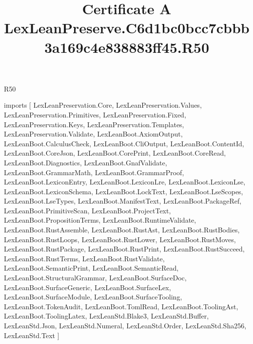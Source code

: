 \begin{lexlean}{R50}
\title{Certificate A LexLeanPreserve.C6d1bc0bcc7cbbb3a169c4e838883ff45.R50}
\begin{coremodule}
imports [
  LexLeanPreservation.Core,
  LexLeanPreservation.Values,
  LexLeanPreservation.Primitives,
  LexLeanPreservation.Fixed,
  LexLeanPreservation.Keys,
  LexLeanPreservation.Templates,
  LexLeanPreservation.Validate,
  LexLeanBoot.AxiomOutput,
  LexLeanBoot.CalculusCheck,
  LexLeanBoot.CliOutput,
  LexLeanBoot.ContentId,
  LexLeanBoot.CoreJson,
  LexLeanBoot.CorePrint,
  LexLeanBoot.CoreRead,
  LexLeanBoot.Diagnostics,
  LexLeanBoot.GnafValidate,
  LexLeanBoot.GrammarMath,
  LexLeanBoot.GrammarProof,
  LexLeanBoot.LexiconEntry,
  LexLeanBoot.LexiconLre,
  LexLeanBoot.LexiconLse,
  LexLeanBoot.LexiconSchema,
  LexLeanBoot.LockText,
  LexLeanBoot.LseScopes,
  LexLeanBoot.LseTypes,
  LexLeanBoot.ManifestText,
  LexLeanBoot.PackageRef,
  LexLeanBoot.PrimitiveScan,
  LexLeanBoot.ProjectText,
  LexLeanBoot.PropositionTerms,
  LexLeanBoot.RuntimeValidate,
  LexLeanBoot.RustAssemble,
  LexLeanBoot.RustAst,
  LexLeanBoot.RustBodies,
  LexLeanBoot.RustLoops,
  LexLeanBoot.RustLower,
  LexLeanBoot.RustMoves,
  LexLeanBoot.RustPackage,
  LexLeanBoot.RustPrint,
  LexLeanBoot.RustSucceed,
  LexLeanBoot.RustTerms,
  LexLeanBoot.RustValidate,
  LexLeanBoot.SemanticPrint,
  LexLeanBoot.SemanticRead,
  LexLeanBoot.StructuralGrammar,
  LexLeanBoot.SurfaceDoc,
  LexLeanBoot.SurfaceGeneric,
  LexLeanBoot.SurfaceLex,
  LexLeanBoot.SurfaceModule,
  LexLeanBoot.SurfaceTooling,
  LexLeanBoot.TokenAudit,
  LexLeanBoot.TomlRead,
  LexLeanBoot.ToolingAst,
  LexLeanBoot.ToolingLatex,
  LexLeanStd.Blake3,
  LexLeanStd.Buffer,
  LexLeanStd.Json,
  LexLeanStd.Numeral,
  LexLeanStd.Order,
  LexLeanStd.Sha256,
  LexLeanStd.Text
]


\end{coremodule}
\end{lexlean}
